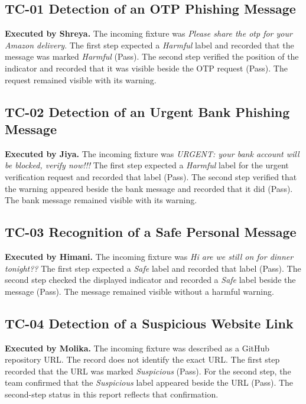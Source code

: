 \documentclass[12pt,letterpaper,twoside,openany]{book}
\begin{document}
\subsection{TC-01 Detection of an OTP Phishing Message}

\textbf{Executed by Shreya.} The incoming fixture was \textit{Please share the otp for your Amazon delivery}. The first step expected a \textit{Harmful} label and recorded that the message was marked \textit{Harmful} (Pass). The second step verified the position of the indicator and recorded that it was visible beside the OTP request (Pass). The request remained visible with its warning.

\subsection{TC-02 Detection of an Urgent Bank Phishing Message}

\textbf{Executed by Jiya.} The incoming fixture was \textit{URGENT: your bank account will be blocked, verify now!!!} The first step expected a \textit{Harmful} label for the urgent verification request and recorded that label (Pass). The second step verified that the warning appeared beside the bank message and recorded that it did (Pass). The bank message remained visible with its warning.

\subsection{TC-03 Recognition of a Safe Personal Message}

\textbf{Executed by Himani.} The incoming fixture was \textit{Hi are we still on for dinner tonight??} The first step expected a \textit{Safe} label and recorded that label (Pass). The second step checked the displayed indicator and recorded a \textit{Safe} label beside the message (Pass). The message remained visible without a harmful warning.

\subsection{TC-04 Detection of a Suspicious Website Link}

\textbf{Executed by Molika.} The incoming fixture was described as a GitHub repository URL. The record does not identify the exact URL. The first step recorded that the URL was marked \textit{Suspicious} (Pass). For the second step, the team confirmed that the \textit{Suspicious} label appeared beside the URL (Pass). The second-step status in this report reflects that confirmation.
\end{document}
